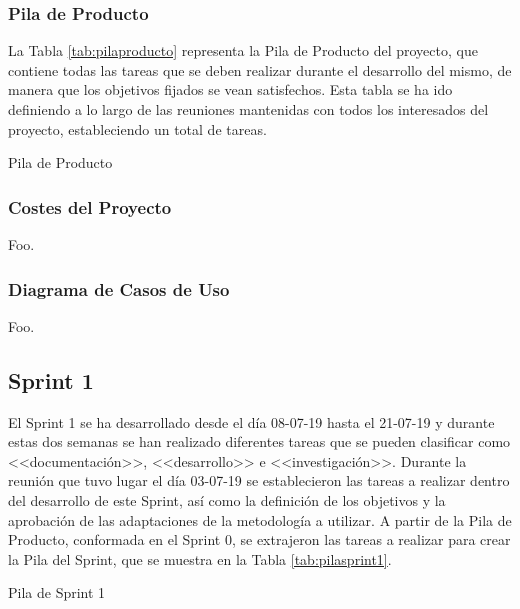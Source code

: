 \subsubsection{Pila de Producto}
La Tabla \ref{tab:pilaproducto} representa la Pila de Producto del proyecto, que contiene todas las tareas que se deben realizar durante el desarrollo del mismo, de manera que los objetivos fijados se vean satisfechos. Esta tabla se ha ido definiendo a lo largo de las reuniones mantenidas con todos los interesados del proyecto, estableciendo un total de  tareas.

\begin{table}[!htbp]
	\centering
	{\small
		
	}
	\caption[Pila de Producto]
	{Pila de Producto}
	\label{tab:pilaproducto}
\end{table}

\subsubsection{Costes del Proyecto}
Foo.

\subsubsection{Diagrama de Casos de Uso}
Foo.

\clearpage

\subsection{Sprint 1}
El Sprint 1 se ha desarrollado desde el día 08-07-19 hasta el 21-07-19 y durante estas dos semanas se han realizado diferentes tareas que se pueden clasificar como <<documentación>>, <<desarrollo>> e <<investigación>>. Durante la reunión que tuvo lugar el día 03-07-19 se establecieron las tareas a realizar dentro del desarrollo de este Sprint, así como la definición de los objetivos y la aprobación de las adaptaciones de la metodología a utilizar. A partir de la Pila de Producto, conformada en el Sprint 0, se extrajeron las tareas a realizar para crear la Pila del Sprint, que se muestra en la Tabla \ref{tab:pilasprint1}.

\begin{table}[!htbp]
	\centering
	{\small
		
	}
	\caption[Pila de Sprint 1]
	{Pila de Sprint 1}
	\label{tab:pilasprint1}
\end{table}

